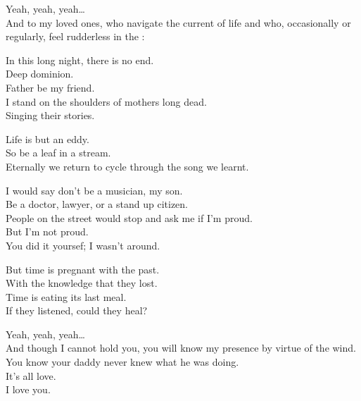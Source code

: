 



Yeah, yeah, yeah… \\
And to my loved ones, who navigate the current of life and who, occasionally or regularly, feel rudderless in the : \\


In this long night, there is no end. \\
Deep dominion. \\
Father be my friend. \\
I stand on the shoulders of mothers long dead. \\
Singing their stories. \\


Life is but an eddy. \\
So be a leaf in a stream. \\
Eternally we return to cycle through the song we learnt. \\


I would say don't be a musician, my son. \\
Be a doctor, lawyer, or a stand up citizen. \\
People on the street would stop and ask me if I'm proud. \\
But I'm not proud. \\
You did it yoursef; I wasn't around. \\


But time is pregnant with the past. \\
With the knowledge that they lost. \\
Time is eating its last meal. \\
If they listened, could they heal? \\


Yeah, yeah, yeah… \\
And though I cannot hold you, you will know my presence by virtue of the wind. \\
You know your daddy never knew what he was doing. \\
It's all love. \\
I love you. \\

